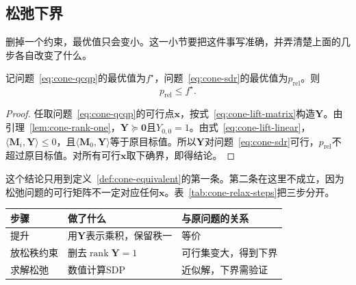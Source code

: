 \subsection{松弛下界}
\label{sec:cone-relax-bound}

删掉一个约束，最优值只会变小。这一小节要把这件事写准确，并弄清楚上面的几步各自改变了什么。

\begin{theorem}[松弛给出下界]
\label{thm:cone-sdr-bound}
记问题~\eqref{eq:cone-qcqp}的最优值为$f^\star$，问题~\eqref{eq:cone-sdr}的最优值为$p_{\mathrm{rel}}$。则
\begin{equation}
 p_{\mathrm{rel}}\leq f^\star.
 \label{eq:cone-sdr-bound}
\end{equation}
\end{theorem}

\begin{proof}
任取问题~\eqref{eq:cone-qcqp}的可行点$\bm{x}$，按式~\eqref{eq:cone-lift-matrix}构造$\bm{Y}$。由引理~\ref{lem:cone-rank-one}，$\bm{Y}\succeq\bm{0}$且$Y_{0,0}=1$。由式~\eqref{eq:cone-lift-linear}，$\langle\bm{M}_i,\bm{Y}\rangle\leq0$，且$\langle\bm{M}_0,\bm{Y}\rangle$等于原目标值。所以$\bm{Y}$对问题~\eqref{eq:cone-sdr}可行，$p_{\mathrm{rel}}$不超过原目标值。对所有可行$\bm{x}$取下确界，即得结论。
\end{proof}

这个结论只用到定义~\ref{def:cone-equivalent}的第一条。第二条在这里不成立，因为松弛问题的可行矩阵不一定对应任何$\bm{x}$。表~\ref{tab:cone-relax-steps}把三步分开。

\begin{BookInlineTable}
  \centering
  \begin{tabular}{lll}
    \toprule
    步骤 & 做了什么 & 与原问题的关系\\
    \midrule
    提升 & 用$\bm{Y}$表示乘积，保留秩一 & 等价\\
    放松秩约束 & 删去$\operatorname{rank}\bm{Y}=1$ & 可行集变大，得到下界\\
    求解松弛 & 数值计算SDP & 近似解，下界需验证\\
    \bottomrule
  \end{tabular}
  \caption{半正定松弛的三个步骤。只有第一步不改变问题。}
  \label{tab:cone-relax-steps}
\end{BookInlineTable}

